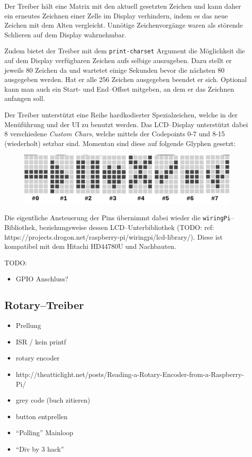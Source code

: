 \documentclass[11pt,ngerman,toc=listof,index=totoc]{scrreprt}
\providecommand{\tightlist}{%
  \setlength{\itemsep}{0pt}\setlength{\parskip}{0pt}}
\begin{document}
Der Treiber hält eine Matrix mit den aktuell gesetzten Zeichen und kann
daher ein erneutes Zeichnen einer Zelle im Display verhindern, indem es
das neue Zeichen mit dem Alten vergleicht. Unnötige Zeichenvorgänge
waren als störende Schlieren auf dem Display wahrnehmbar.

Zudem bietet der Treiber mit dem \texttt{print-charset} Argument die
Möglichkeit die auf dem Display verfügbaren Zeichen aufs selbige
auszugeben. Dazu stellt er jeweils 80 Zeichen da und wartetet einige
Sekunden bevor die nächsten 80 ausgegeben werden. Hat er alle 256
Zeichen ausgegeben beendet er sich. Optional kann man auch ein Start-
und End--Offset mitgeben, an dem er das Zeichnen anfangen soll.

Der Treiber unterstützt eine Reihe hardkodierter Spezialzeichen, welche
in der Menüführung und der UI zu benutzt werden. Das LCD--Display
unterstützt dabei 8 verschiedene \emph{Custom Chars}, welche mittels der
Codepoints 0-7 und 8-15 (wiederholt) setzbar sind. Momentan sind diese
auf folgende Glyphen gesetzt:

\begin{figure}[h!]
  \centering
  \includegraphics[width=1.0\textwidth]{images/symbols.png}
  \caption{}
  \label{eulenfunk-symbols}
\end{figure}

Die eigentliche Ansteuerung der Pins übernimmt dabei wieder die
\texttt{wiringPi}--Bibliothek, beziehungsweise dessen
LCD--Unterbibliothek (TODO: ref:
https://projects.drogon.net/raspberry-pi/wiringpi/lcd-library/). Diese
ist kompatibel mit dem Hitachi HD44780U und Nachbauten.

TODO:

\begin{itemize}
\tightlist
\item
  GPIO Anschluss?
\end{itemize}

\subsection{Rotary--Treiber}\label{rotarytreiber}

\begin{itemize}
\tightlist
\item
  Prellung
\item
  ISR / kein printf
\item
  rotary encoder
\item
  http://theatticlight.net/posts/Reading-a-Rotary-Encoder-from-a-Raspberry-Pi/
\item
  grey code (buch zitieren)
\item
  button entprellen
\item
  \enquote{Polling} Mainloop
\item
  \enquote{Div by 3 hack}
\end{itemize}
\end{document}
